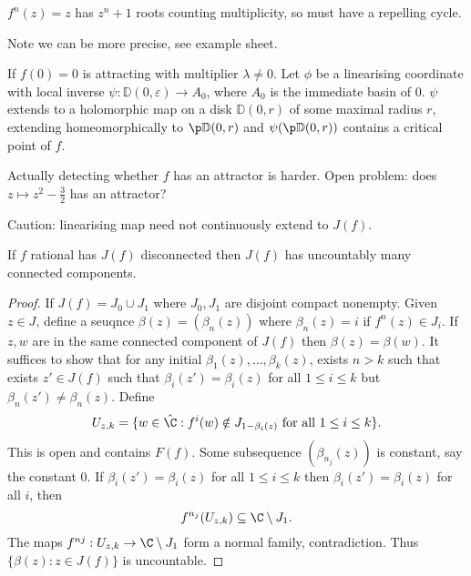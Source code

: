 \documentclass[a4paper]{article}
\newcommand{\D}{\mathbb{D}}
\begin{document}
\begin{remark}
  \(f^n(z) = z\) has \(z^n + 1\) roots counting multiplicity, so must have a repelling cycle.
\end{remark}

Note we can be more precise, see example sheet.

\begin{theorem}
  If \(f(0) = 0\) is attracting with multiplier \(\lambda \ne 0\). Let \(\phi\) be a linearising coordinate with local inverse \(\psi: \D(0, \varepsilon) \to A_0\), where \(A_0\) is the immediate basin of \(0\). \(\psi\) extends to a holomorphic map on a disk \(\D(0, r)\) of some maximal radius \(r\), extending homeomorphically to \(\p \D(0, r)\) and \(\psi(\p \D(0, r))\) contains a critical point of \(f\).
\end{theorem}

\begin{remark}
  Actually detecting whether \(f\) has an attractor is harder. Open problem: does \(z \mapsto z^2 - \frac{3}{2}\) has an attractor?
\end{remark}

Caution: linearising map need not continuously extend to \(J(f)\).

\begin{theorem}
  If \(f\) rational has \(J(f)\) disconnected then \(J(f)\) has uncountably many connected components.
\end{theorem}

\begin{proof}
  If \(J(f) = J_0 \cup J_1\) where \(J_0, J_1\) are disjoint compact nonempty. Given \(z \in J\), define a seuqnce \(\beta(z) = (\beta_n(z))\) where \(\beta_n(z) = i\) if \(f^n(z) \in J_i\). If \(z, w\) are in the same connected component of \(J(f)\) then \(\beta(z) = \beta(w)\). It suffices to show that for any initial \(\beta_1(z), \dots, \beta_k(z)\), exists \(n > k\) such that exists \(z' \in J(f)\) such that \(\beta_i(z') = \beta_i(z)\) for all \(1 \leq i \leq k\) but \(\beta_n(z') \ne \beta_n(z)\). Define
  \[
    U_{z, k} = \{w \in \hat \C: f^i(w) \notin J_{1 - \beta_i(z)} \text{ for all } 1 \leq i \leq k\}.
  \]
  This is open and contains \(F(f)\). Some subsequence \((\beta_{n_j}(z))\) is constant, say the constant \(0\). If \(\beta_i(z') = \beta_i(z)\) for all \(1 \leq i \leq k\) then \(\beta_i(z') = \beta_i(z)\) for all \(i\), then
  \[
    f^{n_j}(U_{z, k}) \subseteq \C \setminus J_1.
  \]
  The maps \(f^{nj}: U_{z, k} \to \C \setminus J_1\) form a normal family, contradiction. Thus \(\{\beta(z): z \in J(f)\}\) is uncountable.
\end{proof}
\end{document}

